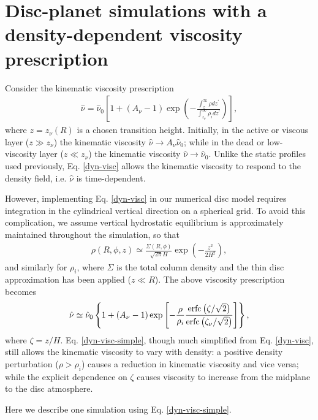 \section{Disc-planet simulations with a density-dependent viscosity
  prescription} 
Consider the kinematic viscosity prescription 
\begin{align}\label{dyn-visc}
  \hat{\nu} = \hat{\nu}_0\left[1 + \left(A_\nu -
    1\right)\exp{\left(-\frac{\int_z^\infty\rho
        dz^\prime}{\int_{z_\nu}^\infty\rho_i dz^\prime}\right)}\right],  
\end{align}
where $z=z_\nu(R)$ is a chosen transition height. Initially, in the active
or viscous layer ($z\gg z_\nu$) the kinematic viscosity $\hat{\nu}\to
A_\nu\hat{\nu}_0$; while in the dead or low-viscosity layer ($z\ll
z_\nu$) the kinematic viscosity $\hat{\nu}\to\hat{\nu}_0$. Unlike the
static profiles used previously, Eq. \ref{dyn-visc} allows the
kinematic viscosity to respond to the density
field, i.e. $\hat{\nu}$ is time-dependent.  

However, implementing Eq. \ref{dyn-visc} in our numerical disc model
requires integration in the cylindrical vertical direction on a
spherical grid. To avoid this complication, we  
assume vertical hydrostatic equilibrium is approximately maintained 
throughout the simulation, so that 
\begin{align}
  \rho(R,\phi, z) \simeq
  \frac{\Sigma(R,\phi)}{\sqrt{2\pi}H}\exp{\left(-\frac{z^2}{2H^2}\right)},  
\end{align}
and similarly for $\rho_i$, where $\Sigma$ is the total column
density and the thin disc approximation has been applied ($z\ll R$). 
The above viscosity prescription becomes
\begin{align}\label{dyn-visc-simple}
   \hat{\nu} \simeq \hat{\nu}_0\left\{1 + \left(A_\nu -
  1\right)\exp{\left[-\frac{\rho}{\rho_i}\frac{\operatorname{erfc}\left(\zeta/\sqrt{2}\right)}{\operatorname{erfc}\left(\zeta_\nu/\sqrt{2}\right)}\right]}\right\}, 
\end{align} 
where $\zeta = z/H$. Eq. \ref{dyn-visc-simple}, though much simplified
from  Eq. \ref{dyn-visc}, still allows the kinematic 
viscosity to vary with density: a
positive density perturbation ($\rho>\rho_i$) causes a reduction in
kinematic viscosity and vice versa; while the explicit dependence on
$\zeta$ causes viscosity to increase from the midplane to the disc
atmosphere.    

Here we describe one simulation using Eq. \ref{dyn-visc-simple}. 
